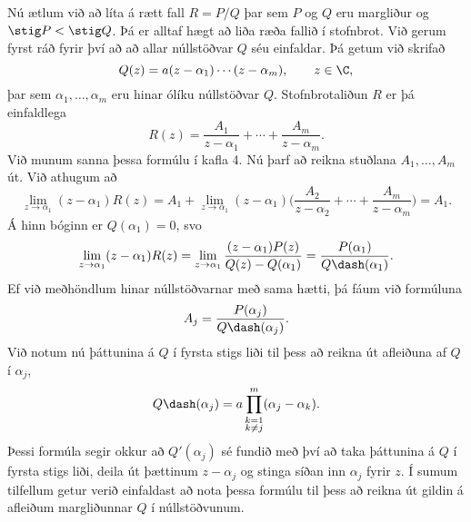 Nú ætlum við að líta á rætt fall  $R=P/Q$ þar sem  $P$ og $Q$ 
eru margliður og $\stig P < \stig Q$.  Þá er 
alltaf hægt að liða ræða fallið
í stofnbrot.  Við gerum fyrst ráð fyrir því að
að allar núllstöðvar $Q$ séu einfaldar.  Þá getum við
skrifað
 \begin{equation*}Q(z)= a(z-\alpha_1)\cdots(z-\alpha_m), \qquad z\in \C,
\label{4.4.1}
 \end{equation*}
þar sem $\alpha_1,\dots,\alpha_m$ eru hinar ólíku núllstöðvar $Q$.
Stofnbrotaliðun $R$ er þá einfaldlega
 \begin{equation*}R(z) = \dfrac {A_1}{z-\alpha_1}+\cdots+\dfrac {A_m}{z-\alpha_m}.
\label{4.4.2}
 \end{equation*}
Við munum sanna þessa formúlu í kafla 4.
Nú þarf að reikna stuðlana $A_1,\dots,A_m$ út.  Við athugum að
 $$\lim\limits_{z\to\alpha_1} (z-\alpha_1)R(z) = A_1
+\lim\limits_{z\to\alpha_1}
(z-{\alpha}_1)\bigg(
\dfrac {A_2}{z-\alpha_2}+\cdots+\dfrac {A_m}{z-\alpha_m}
\bigg)=A_1.
 $$
{Á} hinn bóginn er $Q(\alpha_1)=0$, svo
 $$\lim\limits_{z\to\alpha_1}(z-\alpha_1)R(z) =
\lim\limits_{z\to
\alpha_1}\dfrac{(z-\alpha_1)P(z)}{Q(z)-Q(\alpha_1)}=
\dfrac{P(\alpha_1)}{Q\dash(\alpha_1)}.
 $$
Ef við meðhöndlum hinar núllstöðvarnar með sama hætti, þá fáum við
formúluna
 \begin{equation*}A_j=\dfrac{P(\alpha_j)}{Q\dash(\alpha_j)}.
\label{4.4.3}
 \end{equation*}
Við notum nú þáttunina á $Q$ í fyrsta stigs liði til þess að 
reikna út afleiðuna af $Q$ í ${\alpha}_j$,
 \begin{equation*}Q\dash(\alpha_j)=a\prod_{\substack{k=1\\ k\neq
 j}}^m
(\alpha_j-\alpha_k).
\label{4.4.4}
 \end{equation*}
Þessi formúla segir okkur að $Q'(\alpha_j)$ sé fundið með því að
taka þáttunina á $Q$ í fyrsta stigs liði, deila út þættinum
$z-\alpha_j$ og stinga síðan inn $\alpha_j$ fyrir $z$.
Í sumum tilfellum getur verið einfaldast að nota þessa formúlu til
þess að reikna út gildin á afleiðum margliðunnar $Q$ í núllstöðvunum.


